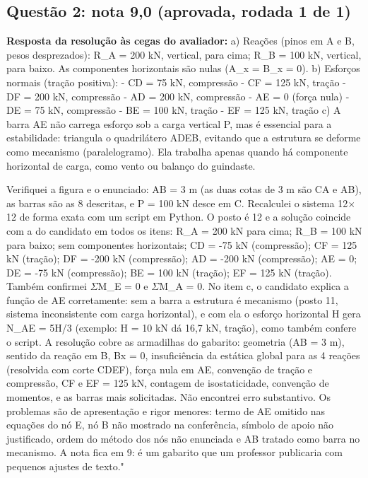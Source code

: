 \documentclass{article}%
\begin{document}
\subsection*{Questão 2: nota 9,0 (aprovada, rodada 1 de 1)}%
\textbf{Resposta da resolução às cegas do avaliador:} a) Reações (pinos em A e B, pesos desprezados): R\_A = 200 kN, vertical, para cima; R\_B = 100 kN, vertical, para baixo. As componentes horizontais são nulas (A\_x = B\_x = 0).\newline%
\newline%
b) Esforços normais (tração positiva):\newline%
{-} CD = 75 kN, compressão\newline%
{-} CF = 125 kN, tração\newline%
{-} DF = 200 kN, compressão\newline%
{-} AD = 200 kN, compressão\newline%
{-} AE = 0 (força nula)\newline%
{-} DE = 75 kN, compressão\newline%
{-} BE = 100 kN, tração\newline%
{-} EF = 125 kN, tração\newline%
\newline%
c) A barra AE não carrega esforço sob a carga vertical P, mas é essencial para a estabilidade: triangula o quadrilátero ADEB, evitando que a estrutura se deforme como mecanismo (paralelogramo). Ela trabalha apenas quando há componente horizontal de carga, como vento ou balanço do guindaste.\par %
Verifiquei a figura e o enunciado: AB = 3 m (as duas cotas de 3 m são CA e AB), as barras são as 8 descritas, e P = 100 kN desce em C. Recalculei o sistema 12$\times$12 de forma exata com um script em Python. O posto é 12 e a solução coincide com a do candidato em todos os itens: R\_A = 200 kN para cima; R\_B = 100 kN para baixo; sem componentes horizontais; CD = -75 kN (compressão); CF = 125 kN (tração); DF = -200 kN (compressão); AD = -200 kN (compressão); AE = 0; DE = -75 kN (compressão); BE = 100 kN (tração); EF = 125 kN (tração). Também confirmei $\Sigma$M\_E = 0 e $\Sigma$M\_A = 0. No item c, o candidato explica a função de AE corretamente: sem a barra a estrutura é mecanismo (posto 11, sistema inconsistente com carga horizontal), e com ela o esforço horizontal H gera N\_AE = 5H/3 (exemplo: H = 10 kN dá 16,7 kN, tração), como também confere o script. A resolução cobre as armadilhas do gabarito: geometria (AB = 3 m), sentido da reação em B, Bx = 0, insuficiência da estática global para as 4 reações (resolvida com corte CDEF), força nula em AE, convenção de tração e compressão, CF e EF = 125 kN, contagem de isostaticidade, convenção de momentos, e as barras mais solicitadas. Não encontrei erro substantivo. Os problemas são de apresentação e rigor menores: termo de AE omitido nas equações do nó E, nó B não mostrado na conferência, símbolo de apoio não justificado, ordem do método dos nós não enunciada e AB tratado como barra no mecanismo. A nota fica em 9: é um gabarito que um professor publicaria com pequenos ajustes de texto."%
\end{document}
